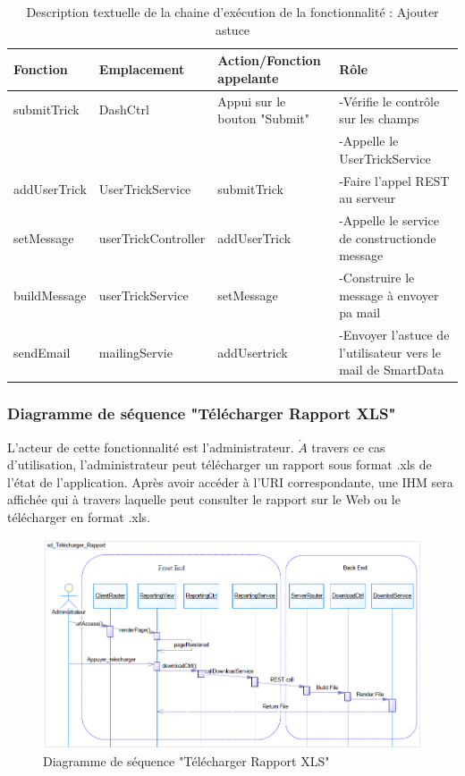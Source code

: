 \newpage

\begin{table}
	\caption{Description textuelle de la chaine d'exécution de la fonctionnalité : Ajouter astuce}
	\label{tab3.1}
	\begin{center}
		\begin{tabular}{|L{2.2cm}|L{2.8cm}|L{2.8cm}|L{4.7cm}|}
			\hline
			\textbf{Fonction} & \textbf{Emplacement} & \textbf{Action/Fonction appelante} & \textbf{Rôle}\\
			\hline
			submitTrick & DashCtrl & Appui sur le bouton "Submit" & -Vérifie le contrôle sur les champs\\
			& & &-Appelle le UserTrickService\\
			\hline
			addUserTrick & UserTrickService & submitTrick & -Faire l'appel REST au serveur\\
			\hline
			setMessage & userTrickController & addUserTrick & -Appelle le service de constructionde message\\
			\hline
			buildMessage & userTrickService & setMessage & -Construire le message à envoyer pa mail\\
			\hline
			sendEmail & mailingServie & addUsertrick & -Envoyer l'astuce de l'utilisateur vers le mail de SmartData\\
			\hline
			
		\end{tabular}
	\end{center}
\end{table}

\subsubsection{Diagramme de séquence "Télécharger Rapport XLS"}

L'acteur de cette fonctionnalité est l'administrateur. $\grave{A}$ travers ce cas d'utilisation, l'administrateur peut télécharger un rapport sous format .xls de l'état de l'application. Après avoir accéder à l'URI correspondante, une IHM sera affichée qui à travers laquelle peut consulter le rapport sur le Web ou le télécharger en format .xls.

\begin{figure}[!h]
	\begin{center}
		\includegraphics[width=0.64\textheight]{figures/sd2}
	\end{center}
	\caption{Diagramme de séquence "Télécharger Rapport XLS"}
	\label{fig3.9}
\end{figure}

